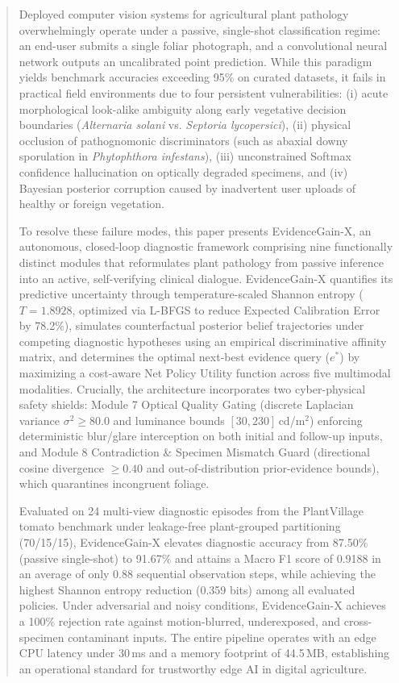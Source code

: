 \documentclass[conference]{IEEEtran}
\begin{document}
\begin{abstract}
Deployed computer vision systems for agricultural plant pathology overwhelmingly operate under a passive, single-shot classification regime: an end-user submits a single foliar photograph, and a convolutional neural network outputs an uncalibrated point prediction. While this paradigm yields benchmark accuracies exceeding 95\% on curated datasets, it fails in practical field environments due to four persistent vulnerabilities: (i) acute morphological look-alike ambiguity along early vegetative decision boundaries (\textit{Alternaria solani} vs. \textit{Septoria lycopersici}), (ii) physical occlusion of pathognomonic discriminators (such as abaxial downy sporulation in \textit{Phytophthora infestans}), (iii) unconstrained Softmax confidence hallucination on optically degraded specimens, and (iv) Bayesian posterior corruption caused by inadvertent user uploads of healthy or foreign vegetation.

To resolve these failure modes, this paper presents EvidenceGain-X, an autonomous, closed-loop diagnostic framework comprising nine functionally distinct modules that reformulates plant pathology from passive inference into an active, self-verifying clinical dialogue. EvidenceGain-X quantifies its predictive uncertainty through temperature-scaled Shannon entropy ($T = 1.8928$, optimized via L-BFGS to reduce Expected Calibration Error by 78.2\%), simulates counterfactual posterior belief trajectories under competing diagnostic hypotheses using an empirical discriminative affinity matrix, and determines the optimal next-best evidence query ($e^*$) by maximizing a cost-aware Net Policy Utility function across five multimodal modalities. Crucially, the architecture incorporates two cyber-physical safety shields: Module 7 Optical Quality Gating (discrete Laplacian variance $\sigma^2 \ge 80.0$ and luminance bounds $[30, 230]$\,cd/m$^2$) enforcing deterministic blur/glare interception on both initial and follow-up inputs, and Module 8 Contradiction \& Specimen Mismatch Guard (directional cosine divergence $\ge 0.40$ and out-of-distribution prior-evidence bounds), which quarantines incongruent foliage.

Evaluated on 24 multi-view diagnostic episodes from the PlantVillage tomato benchmark under leakage-free plant-grouped partitioning (70/15/15), EvidenceGain-X elevates diagnostic accuracy from 87.50\% (passive single-shot) to 91.67\% and attains a Macro F1 score of 0.9188 in an average of only 0.88 sequential observation steps, while achieving the highest Shannon entropy reduction (0.359 bits) among all evaluated policies. Under adversarial and noisy conditions, EvidenceGain-X achieves a 100\% rejection rate against motion-blurred, underexposed, and cross-specimen contaminant inputs. The entire pipeline operates with an edge CPU latency under 30\,ms and a memory footprint of 44.5\,MB, establishing an operational standard for trustworthy edge AI in digital agriculture.
\end{abstract}
\end{document}
